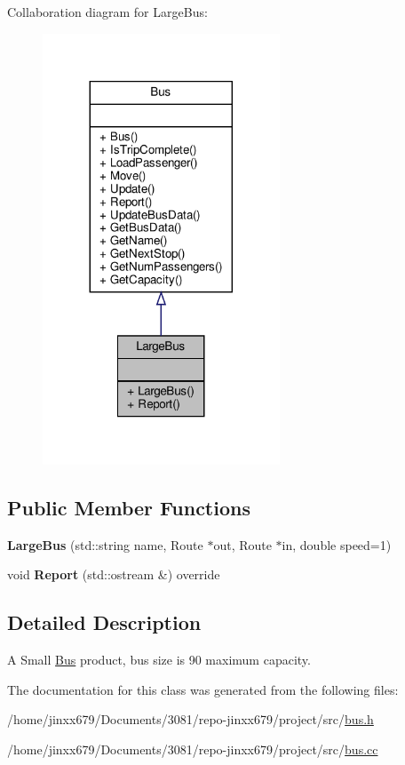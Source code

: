 Collaboration diagram for Large\+Bus\+:\nopagebreak
\begin{figure}[H]
\begin{center}
\leavevmode
\includegraphics[width=200pt]{classLargeBus__coll__graph}
\end{center}
\end{figure}
\subsection*{Public Member Functions}
\begin{DoxyCompactItemize}
\item 
\mbox{\label{classLargeBus_ae1756756d1dbb8db83b4887136e21686}} 
{\bfseries Large\+Bus} (std\+::string name, Route $\ast$out, Route $\ast$in, double speed=1)
\item 
\mbox{\label{classLargeBus_a4e20f9c3199c1099f653f755b618ccea}} 
void {\bfseries Report} (std\+::ostream \&) override
\end{DoxyCompactItemize}


\subsection{Detailed Description}
A Small \hyperlink{classBus}{Bus} product, bus size is 90 maximum capacity. 

The documentation for this class was generated from the following files\+:\begin{DoxyCompactItemize}
\item 
/home/jinxx679/\+Documents/3081/repo-\/jinxx679/project/src/\hyperlink{bus_8h}{bus.\+h}\item 
/home/jinxx679/\+Documents/3081/repo-\/jinxx679/project/src/\hyperlink{bus_8cc}{bus.\+cc}\end{DoxyCompactItemize}
